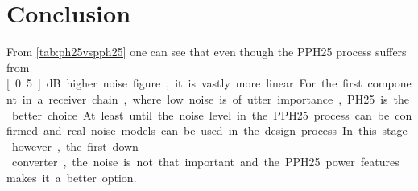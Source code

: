 	\section{Conclusion}
		From \autoref{tab:ph25vspph25} one can see that even though the PPH25 process suffers from \unit[0.5]{dB} higher noise figure, it is vastly more linear.


		For the first component in a receiver chain, where low noise is of utter importance, PH25 is the better choice. At least until the noise level in the PPH25 process can be confirmed and real noise models can be used in the design process. In this stage however, the first down-converter, the noise is not that important and the PPH25 power features makes it a better option.
